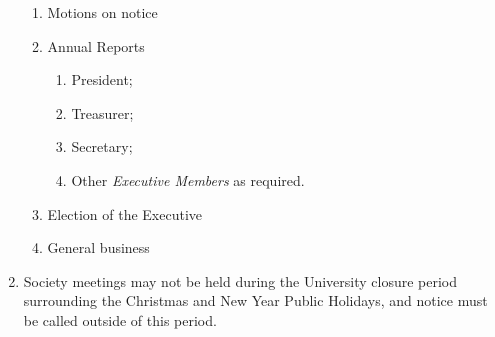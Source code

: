 \documentclass[11pt]{article}
\begin{document}
\begin{enumerate}[\thesection .1]
\begin{enumerate}[\hspace{5mm}1.]
    	\item Motions on notice
    	\item Annual Reports
    	\begin{enumerate}
            \item President;
            \item Treasurer;
            \item Secretary;
            \item Other \textit{Executive Members} as required.
        \end{enumerate}
        \item Election of the Executive
        \item General business
    \end{enumerate}
    \item Society meetings may not be held during the University closure period surrounding the Christmas and New Year Public Holidays, and notice must be called outside of this period.
\end{enumerate}
\end{document}
